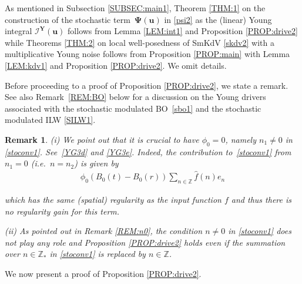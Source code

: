 \documentclass[letterpaper, 11pt,  reqno]{amsart}
\newtheorem{remark}[theorem]{Remark}
\newcommand{\1}{\hspace{0.5mm}\textup{I}\hspace{0.5mm}}
\newcommand{\I}{\mathcal{I}}
\newcommand{\noi}{\noindent}
\newcommand{\Z}{\mathbb{Z}}
\newcommand{\ft}{\widehat}
\newcommand{\uu}{\mathbf{u}}
\newcommand{\PPsi}{\pmb{\Psi}}
\newcommand{\YY}{\mathbf{Y}}
\numberwithin{equation}{section}
\numberwithin{theorem}{section}
\begin{document}
As mentioned in Subsection \ref{SUBSEC:main1}, 
Theorem \ref{THM:1}
on the construction of the stochastic term~$\PPsi(\uu)$
 in \eqref{psi2}
 as the (linear) Young integral $\I^\YY(\uu)$
follows from 
Lemma \ref{LEM:int1}
and 
Proposition \ref{PROP:drive2}
while 
Theorems \ref{THM:2} 
on local well-posedness of 
 SmKdV \eqref{skdv2}
with a multiplicative Young noise
 follows from 
Proposition \ref{PROP:main}
with 
Lemma \ref{LEM:kdv1} and 
Proposition \ref{PROP:drive2}.
We omit details.

Before proceeding to a proof of 
Proposition \ref{PROP:drive2}, 
we state a remark.
See also Remark~\ref{REM:BO} below
for a discussion
on the Young drivers associated with 
the stochastic modulated BO~\eqref{sbo1}
and 
the stochastic modulated ILW \eqref{SILW1}.




\begin{remark}\label{REM:YG1}
\rm
(i)
We point out that it is crucial to have $\phi_0 = 0$, 
namely $n_1 \ne 0$
in \eqref{stoconv1}.
See~\eqref{YG3d} and \eqref{YG3e}.
Indeed, the contribution to~\eqref{stoconv1}
from $n_1 = 0$ (i.e.~$n = n_2$) is given by 
\begin{align*}
\phi_0
(B_{0}(t) - B_{0}(r))
  \sum_{n\in \Z} 
 \ft f(n)
 e_n 
\end{align*}

\noi
which has the same (spatial) regularity as the input function $f$
and thus there is no regularity gain 
for this term.




\smallskip

\noi
(ii)
As pointed out in Remark \ref{REM:n0}, 
the condition $n \ne 0$ in \eqref{stoconv1}
does not play any role
and Proposition \ref{PROP:drive2}
holds even if the summation over $n \in \Z_*$
in \eqref{stoconv1}
is replaced by $n \in \Z$.

\end{remark}




We now present a proof of
Proposition \ref{PROP:drive2}.
\end{document}

